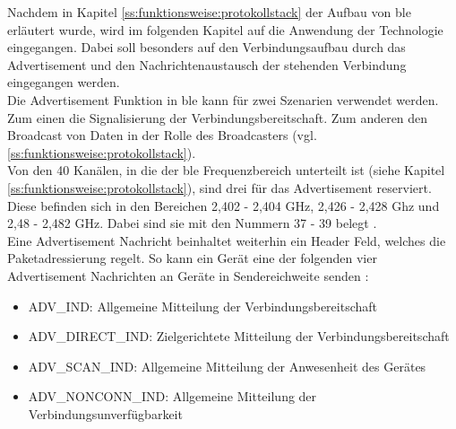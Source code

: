 \noindent Nachdem in Kapitel \ref{ss:funktionsweise:protokollstack} der Aufbau von \ac{ble} erläutert wurde, wird im folgenden Kapitel auf die Anwendung der Technologie eingegangen. Dabei soll besonders auf den Verbindungsaufbau durch das Advertisement und den Nachrichtenaustausch der stehenden Verbindung eingegangen werden.\\
\noindent Die Advertisement Funktion in \ac{ble} kann für zwei Szenarien verwendet werden. Zum einen die Signalisierung der Verbindungsbereitschaft. Zum anderen den Broadcast von Daten in der Rolle des Broadcasters (vgl. \ref{ss:funktionsweise:protokollstack}).\\
\noindent Von den 40 Kanälen, in die der \ac{ble} Frequenzbereich unterteilt ist (siehe Kapitel \ref{ss:funktionsweise:protokollstack}), sind drei für das Advertisement reserviert. Diese befinden sich in den Bereichen 2,402 - 2,404 GHz, 2,426 - 2,428 Ghz und 2,48 - 2,482 GHz. Dabei sind sie mit den Nummern 37 - 39 belegt \cite[Seite 16]{Townsend14:GSB}.\\
\noindent Eine Advertisement Nachricht beinhaltet weiterhin ein Header Feld, welches die Paketadressierung regelt. So kann ein Gerät eine der folgenden vier Advertisement Nachrichten an Geräte in Sendereichweite senden \cite[Seite 22]{Townsend14:GSB}:
\begin{itemize}
	\setlength{\itemsep}{1pt}
	\item{ADV\_IND: Allgemeine Mitteilung der Verbindungsbereitschaft}
	\item{ADV\_DIRECT\_IND: Zielgerichtete Mitteilung der Verbindungsbereitschaft}
	\item{ADV\_SCAN\_IND: Allgemeine Mitteilung der Anwesenheit des Gerätes}
	\item{ADV\_NONCONN\_IND: Allgemeine Mitteilung der Verbindungsunverfügbarkeit}
\end{itemize} 

